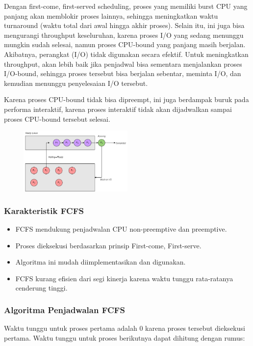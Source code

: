 \documentclass[12pt]{article}
\begin{document}
	Dengan first-come, first-served scheduling, proses yang memiliki burst CPU yang panjang akan memblokir proses lainnya, sehingga meningkatkan waktu turnaround (waktu total dari awal hingga akhir proses). Selain itu, ini juga bisa mengurangi throughput keseluruhan, karena proses I/O yang sedang menunggu mungkin sudah selesai, namun proses CPU-bound yang panjang masih berjalan. Akibatnya, perangkat (I/O) tidak digunakan secara efektif. Untuk meningkatkan throughput, akan lebih baik jika penjadwal bisa sementara menjalankan proses I/O-bound, sehingga proses tersebut bisa berjalan sebentar, meminta I/O, dan kemudian menunggu penyelesaian I/O tersebut.
	
	Karena proses CPU-bound tidak bisa dipreempt, ini juga berdampak buruk pada performa interaktif, karena proses interaktif tidak akan dijadwalkan sampai proses CPU-bound tersebut selesai.
		\begin{figure} [h]
			\centering
			\includegraphics[width=0.5\textwidth]{assets/FCFS2.jpg}
			\label{fig:diagram}
		\end{figure}
		
	\subsubsection*{Karakteristik FCFS}
	\begin{itemize}
		\item FCFS mendukung penjadwalan CPU non-preemptive dan preemptive.
		\item Proses dieksekusi berdasarkan prinsip First-come, First-serve.
		\item Algoritma ini mudah diimplementasikan dan digunakan.
		\item FCFS kurang efisien dari segi kinerja karena waktu tunggu rata-ratanya cenderung tinggi.		
	\end{itemize}
		
	\subsubsection*{Algoritma Penjadwalan FCFS}
	Waktu tunggu untuk proses pertama adalah 0 karena proses tersebut dieksekusi pertama. Waktu tunggu untuk proses berikutnya dapat dihitung dengan rumus:
	
\end{document}

